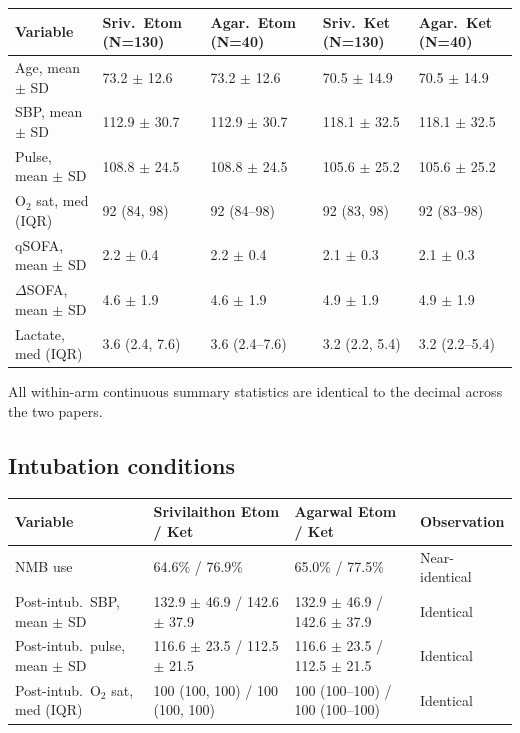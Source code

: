 \documentclass[11pt]{article}
\begin{document}
\begin{table}[H]
\centering\footnotesize
\begin{tabularx}{\textwidth}{L{2.2cm} C{2.2cm} C{2.2cm} C{2.2cm} C{2.2cm}}
\toprule
\textbf{Variable} & \textbf{Sriv.\ Etom (N=130)} & \textbf{Agar.\ Etom (N=40)} & \textbf{Sriv.\ Ket (N=130)} & \textbf{Agar.\ Ket (N=40)} \\
\midrule
Age, mean $\pm$ SD & 73.2 $\pm$ 12.6 & 73.2 $\pm$ 12.6 & 70.5 $\pm$ 14.9 & 70.5 $\pm$ 14.9 \\
SBP, mean $\pm$ SD & 112.9 $\pm$ 30.7 & 112.9 $\pm$ 30.7 & 118.1 $\pm$ 32.5 & 118.1 $\pm$ 32.5 \\
Pulse, mean $\pm$ SD & 108.8 $\pm$ 24.5 & 108.8 $\pm$ 24.5 & 105.6 $\pm$ 25.2 & 105.6 $\pm$ 25.2 \\
O$_2$ sat, med (IQR) & 92 (84, 98) & 92 (84--98) & 92 (83, 98) & 92 (83--98) \\
qSOFA, mean $\pm$ SD & 2.2 $\pm$ 0.4 & 2.2 $\pm$ 0.4 & 2.1 $\pm$ 0.3 & 2.1 $\pm$ 0.3 \\
$\Delta$SOFA, mean $\pm$ SD & 4.6 $\pm$ 1.9 & 4.6 $\pm$ 1.9 & 4.9 $\pm$ 1.9 & 4.9 $\pm$ 1.9 \\
Lactate, med (IQR) & 3.6 (2.4, 7.6) & 3.6 (2.4--7.6) & 3.2 (2.2, 5.4) & 3.2 (2.2--5.4) \\
\bottomrule
\end{tabularx}
\end{table}

\noindent All within-arm continuous summary statistics are identical to the decimal across the two papers.

\subsection{Intubation conditions}

\begin{table}[H]
\centering\footnotesize
\begin{tabularx}{\textwidth}{L{3cm} C{3.2cm} C{3.2cm} L{2.5cm}}
\toprule
\textbf{Variable} & \textbf{Srivilaithon Etom / Ket} & \textbf{Agarwal Etom / Ket} & \textbf{Observation} \\
\midrule
NMB use & 64.6\% / 76.9\% & 65.0\% / 77.5\% & Near-identical \\
Post-intub.\ SBP, mean $\pm$ SD & 132.9 $\pm$ 46.9 / 142.6 $\pm$ 37.9 & 132.9 $\pm$ 46.9 / 142.6 $\pm$ 37.9 & Identical \\
Post-intub.\ pulse, mean $\pm$ SD & 116.6 $\pm$ 23.5 / 112.5 $\pm$ 21.5 & 116.6 $\pm$ 23.5 / 112.5 $\pm$ 21.5 & Identical \\
Post-intub.\ O$_2$ sat, med (IQR) & 100 (100, 100) / 100 (100, 100) & 100 (100--100) / 100 (100--100) & Identical \\
\bottomrule
\end{tabularx}
\end{table}
\end{document}
